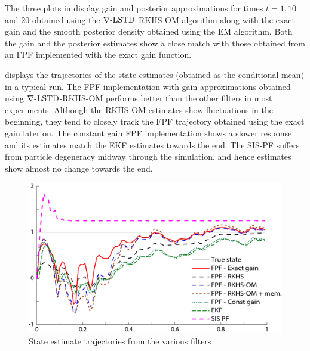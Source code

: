 The three plots in  display  gain and posterior approximations for times $t = 1,10$ and $20$ obtained using the $\nabla\text{-LSTD}$-RKHS-OM algorithm along with the exact gain and the smooth posterior density obtained using the EM algorithm. Both the gain and the posterior estimates show a close match with those obtained from an FPF implemented with the exact gain function.


 displays the trajectories of the state estimates (obtained as the conditional mean) in a typical run.  The FPF implementation with gain approximations obtained using $\nabla\text{-LSTD}$-RKHS-OM  performs better than the other filters in most experiments. Although the RKHS-OM estimates show fluctuations in the beginning, they tend to closely track the FPF trajectory obtained using the exact gain later on. The constant gain FPF implementation shows a slower response and its estimates match the EKF estimates towards the end. The SIS-PF suffers from particle degeneracy midway through the simulation, and hence estimates show almost no change towards the end.

\begin{figure}[htbp]
	\centering
	\includegraphics[width = 5in]{images/Chap4_param_est_state_comparison}
	\caption{ State estimate trajectories from the various filters}
	\label{fig:steady_state_estimate}
\end{figure}

